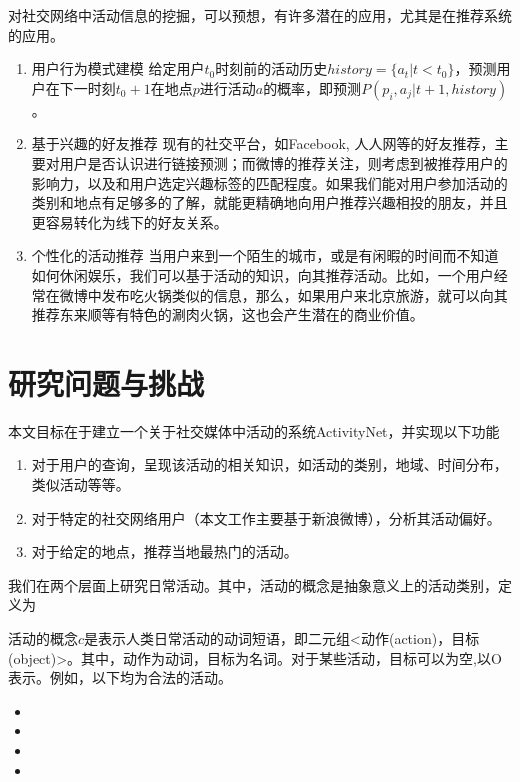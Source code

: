 对社交网络中活动信息的挖掘，可以预想，有许多潜在的应用，尤其是在推荐系统的应用。
\begin{enumerate}
\item{\heiti 用户行为模式建模} 给定用户$t_0$时刻前的活动历史$history = \{a_t|t<t_0\}$，预测用户在下一时刻$t_0+1$在地点$p$进行活动$a$的概率，即预测$P(p_i, a_j|t+1,history)$。
\item{\heiti 基于兴趣的好友推荐} 现有的社交平台，如Facebook, 人人网等的好友推荐，主要对用户是否认识进行链接预测；而微博的推荐关注，则考虑到被推荐用户的影响力，以及和用户选定兴趣标签的匹配程度。如果我们能对用户参加活动的类别和地点有足够多的了解，就能更精确地向用户推荐兴趣相投的朋友，并且更容易转化为线下的好友关系。
\item{\heiti 个性化的活动推荐} 当用户来到一个陌生的城市，或是有闲暇的时间而不知道如何休闲娱乐，我们可以基于活动的知识，向其推荐活动。比如，一个用户经常在微博中发布吃火锅类似的信息，那么，如果用户来北京旅游，就可以向其推荐东来顺等有特色的涮肉火锅，这也会产生潜在的商业价值。
\end{enumerate}

\section{研究问题与挑战}

本文目标在于建立一个关于社交媒体中活动的系统ActivityNet，并实现以下功能

\begin{enumerate}
\item 对于用户的查询，呈现该活动的相关知识，如活动的类别，地域、时间分布，类似活动等等。
\item 对于特定的社交网络用户（本文工作主要基于新浪微博），分析其活动偏好。
\item 对于给定的地点，推荐当地最热门的活动。
\end{enumerate}

我们在两个层面上研究日常活动。其中，活动的概念是抽象意义上的活动类别，定义为
\begin{definition}
活动的概念$c$是表示人类日常活动的动词短语，即二元组<动作(action)，目标(object)>。其中，动作为动词，目标为名词。对于某些活动，目标可以为空,以O表示。例如，以下均为合法的活动。
\label{def:instance}
\begin{itemize}
\item <吃,烤鸭>
\item <参加,会议>
\item <游泳,O>
\item <旅游,O>
\end{itemize}
\label{def:concept}
\end{definition}

